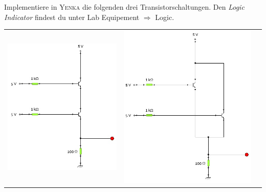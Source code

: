 \begin{Aufgabe} \label{Aufg:Logikgatter}
Implementiere in \textsc{Yenka} die folgenden drei Transistorschaltungen. Den \emph{Logic Indicator} findest du unter Lab Equipement $\Rightarrow$ Logic. 
\begin{center}
\begin{tabular}{ccc}
\includegraphics[scale=.4]{pics/ANDTrans}
&
\includegraphics[scale=.4]{pics/ORTrans}

\end{tabular}
\end{center}
\end{Aufgabe}
